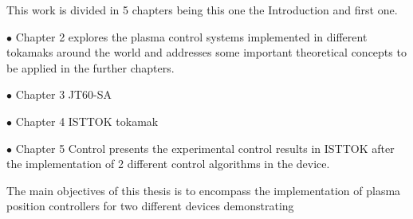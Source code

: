This work is divided in 5 chapters being this one the Introduction and first one.\smallskip

$\bullet$ Chapter 2 explores the plasma control systems implemented in different tokamaks around the world and addresses some important theoretical concepts to be applied in the further chapters.\smallskip

$\bullet$ Chapter 3 JT60-SA \smallskip

$\bullet$ Chapter 4 ISTTOK tokamak \smallskip

$\bullet$ Chapter 5 Control presents the experimental control results in ISTTOK after the implementation of 2 different control algorithms in the device. \smallskip


The main objectives of this thesis is to encompass the implementation of plasma position controllers for two different devices demonstrating 